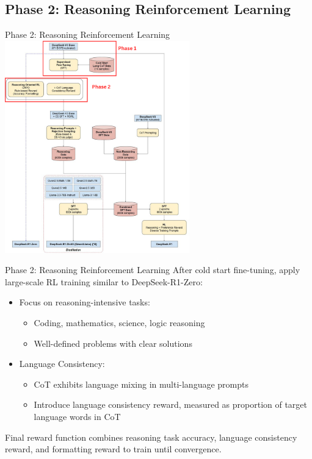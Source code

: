 \documentclass[8pt]{beamer}
\begin{document}
\subsection{Phase 2: Reasoning Reinforcement Learning}

\begin{frame}{Phase 2: Reasoning Reinforcement Learning}
\centering
\includegraphics[width=0.6\textwidth]{figures/phase2.png}
\end{frame}

\begin{frame}{Phase 2: Reasoning Reinforcement Learning}
After cold start fine-tuning, apply large-scale RL training similar to DeepSeek-R1-Zero:

\begin{itemize}\setlength{\itemsep}{10pt}
    \item Focus on reasoning-intensive tasks:
        \begin{itemize}
        \item Coding, mathematics, science, logic reasoning
        \item Well-defined problems with clear solutions
        \end{itemize}
    
    \item Language Consistency:
        \begin{itemize}
        \item CoT exhibits language mixing in multi-language prompts
        \item Introduce language consistency reward, measured as proportion of target language words in CoT
        \end{itemize}

\end{itemize}

\vspace{1em}

Final reward function combines reasoning task accuracy, language consistency reward, and formatting reward to train until convergence.
\end{frame}
\end{document}
